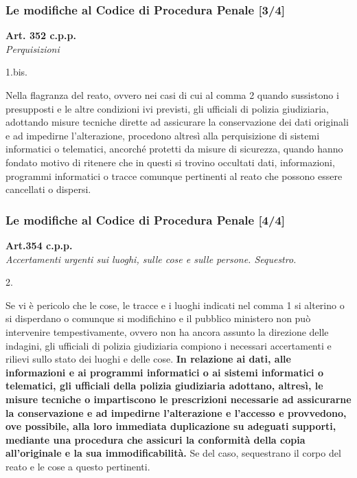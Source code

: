 \documentclass[11pt]{beamer}
\begin{document}
	\begin{frame}
		\frametitle{Le modifiche al Codice di Procedura Penale [3/4]}
		\fontsize{8pt}{\baselineskip}\selectfont
			\begin{center}
				\textbf{Art. 352 c.p.p.} \\\textit{Perquisizioni}
			\end{center}
			\begin{labeling}{1.bis.}
				\item[\textellipsis]
				\item[1-bis.] Nella flagranza del reato, ovvero nei casi di cui al comma 2 quando sussistono i presupposti e le altre condizioni ivi previsti, gli ufficiali di polizia giudiziaria, adottando misure tecniche dirette ad assicurare la conservazione dei dati originali e ad impedirne l'alterazione, procedono altresì alla perquisizione di sistemi informatici o telematici, ancorché protetti da misure di sicurezza, quando hanno fondato motivo di ritenere che in questi si trovino occultati dati, informazioni, programmi informatici o tracce comunque pertinenti al reato che possono essere cancellati o dispersi.
				\item[\textellipsis]
			\end{labeling}
	\end{frame}
	\begin{frame}
		\frametitle{Le modifiche al Codice di Procedura Penale [4/4]}
		\fontsize{8pt}{\baselineskip}\selectfont
			\begin{center}
				\textbf{Art.354 c.p.p.}\\\textit{Accertamenti urgenti sui luoghi, sulle cose e sulle persone. Sequestro.}
			\end{center}
			\begin{labeling}{2.}
				\fontsize{7pt}{\baselineskip}\selectfont
				\setcounter{enumi}{1}
				\item[2.] Se vi è pericolo che le cose, le tracce e i luoghi indicati nel comma 1 si alterino o si disperdano o comunque si modifichino e il pubblico ministero non può intervenire tempestivamente, ovvero non ha ancora assunto la direzione delle indagini, gli ufficiali di polizia giudiziaria compiono i necessari accertamenti e rilievi sullo stato dei luoghi e delle cose. \textbf{In relazione ai dati, alle informazioni e ai programmi informatici o ai sistemi informatici o telematici, gli ufficiali della polizia giudiziaria adottano, altresì, le misure tecniche o impartiscono le prescrizioni necessarie ad assicurarne la conservazione e ad impedirne l'alterazione e l'accesso e provvedono, ove possibile, alla loro immediata duplicazione su adeguati supporti, mediante una procedura che assicuri la conformità della copia all'originale e la sua immodificabilità.} Se del caso, sequestrano il corpo del reato e le cose a questo pertinenti.
			\end{labeling}
	\end{frame}
\end{document}
